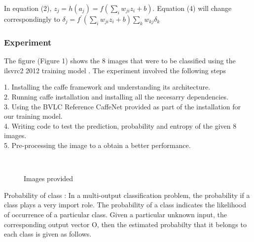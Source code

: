 \documentclass[conference]{IEEEtran}
\begin{document}
In equation (2),   $ z_{j} = h(a_{j}) = f( \sum\limits_{i} w _{ji} z _{i} + b) $. Equation (4) will change correspondingly to $\delta _{j} = f^{'}(\sum\limits_{i} w _{ji} z _{i} + b) \sum\limits_{k} w_{kj} \delta_{k} $ \\
 

\subsubsection{Experiment}


The figure (Figure 1) shows the 8 images that were to be classified using the ilsvrc2 2012 training model \cite{IEEEhowto:kopka}. The experiment involved the following steps

1. Installing the caffe framework and understanding its architecture. \\
2. Running  caffe installation and installing all the necesarry dependencies. \\
3. Using the  BVLC Reference CaffeNet provided\cite{caffe} as part of the installation for our training model. \\
4. Writing code to test the prediction, probability and entropy of the given 8 images.\\
5. Pre-processing the image to a obtain a better performance.\\


\begin{figure*}[!t]
\centering
{} 
\hfil
{}
\hfil
{}
\hfil
{} \\
{}
\hfil
{}
\hfil
{}
\hfil
{}
\hfil


\caption{Images provided}
\label{fig_sim}

\end{figure*}



Probability of class \cite {probability distribution} : In a multi-output classification problem, the probability if a class plays a very import role. The probability of a class indicates the likelihood of occurrence of a particular class. Given a particular unknown input, the corresponding output vector O, then the estimated probabilty that it belongs to each class is given as follows.
\end{document}
